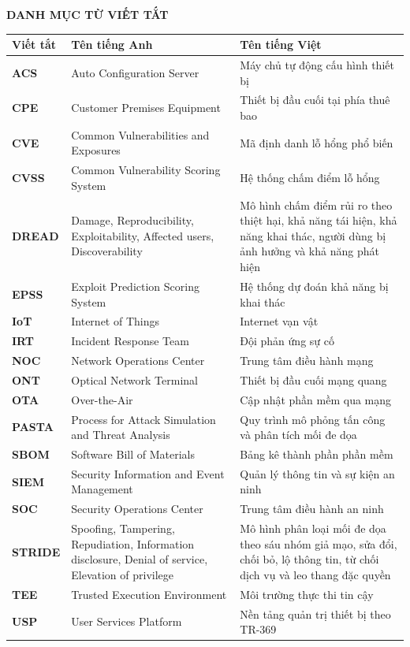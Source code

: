 \documentclass[../DoAn.tex]{subfiles}
\begin{document}
\begin{center}
    \textbf{DANH MỤC TỪ VIẾT TẮT} \\
\end{center}
\vspace{0.5cm}

\begin{longtable}{l p{5cm} p{6cm}}
\hline
\textbf{Viết tắt} & \textbf{Tên tiếng Anh} & \textbf{Tên tiếng Việt} \\ \hline
\textbf{ACS} & Auto Configuration Server & Máy chủ tự động cấu hình thiết bị \\
\textbf{CPE} & Customer Premises Equipment & Thiết bị đầu cuối tại phía thuê bao \\
\textbf{CVE} & Common Vulnerabilities and Exposures & Mã định danh lỗ hổng phổ biến \\
\textbf{CVSS} & Common Vulnerability Scoring System & Hệ thống chấm điểm lỗ hổng \\
\textbf{DREAD} & Damage, Reproducibility, Exploitability, Affected users, Discoverability & Mô hình chấm điểm rủi ro theo thiệt hại, khả năng tái hiện, khả năng khai thác, người dùng bị ảnh hưởng và khả năng phát hiện \\
\textbf{EPSS} & Exploit Prediction Scoring System & Hệ thống dự đoán khả năng bị khai thác \\
\textbf{IoT} & Internet of Things & Internet vạn vật \\
\textbf{IRT} & Incident Response Team & Đội phản ứng sự cố \\
\textbf{NOC} & Network Operations Center & Trung tâm điều hành mạng \\
\textbf{ONT} & Optical Network Terminal & Thiết bị đầu cuối mạng quang \\
\textbf{OTA} & Over-the-Air & Cập nhật phần mềm qua mạng \\
\textbf{PASTA} & Process for Attack Simulation and Threat Analysis & Quy trình mô phỏng tấn công và phân tích mối đe dọa \\
\textbf{SBOM} & Software Bill of Materials & Bảng kê thành phần phần mềm \\
\textbf{SIEM} & Security Information and Event Management & Quản lý thông tin và sự kiện an ninh \\
\textbf{SOC} & Security Operations Center & Trung tâm điều hành an ninh \\
\textbf{STRIDE} & Spoofing, Tampering, Repudiation, Information disclosure, Denial of service, Elevation of privilege & Mô hình phân loại mối đe dọa theo sáu nhóm giả mạo, sửa đổi, chối bỏ, lộ thông tin, từ chối dịch vụ và leo thang đặc quyền \\
\textbf{TEE} & Trusted Execution Environment & Môi trường thực thi tin cậy \\
\textbf{USP} & User Services Platform & Nền tảng quản trị thiết bị theo TR-369 \\
\hline
\end{longtable}
\end{document}
